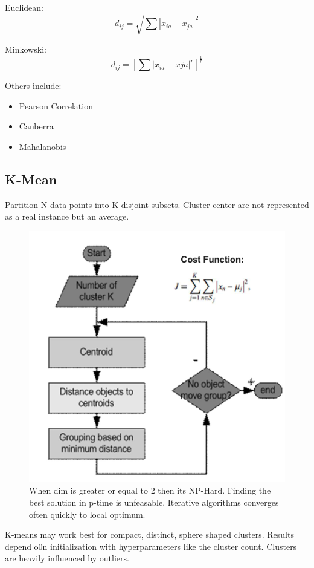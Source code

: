 \documentclass[../Main.tex]{subfiles}
\begin{document}
Euclidean:
\begin{equation}
    d_{ij} = \sqrt{\sum |x_{ia} - x_{ja}|^2 }
\end{equation}

Minkowski:
\begin{equation}
    d_{ij} = [\sum |x_{ia}- x{ja}|^r]^{\frac{1}{r}} 
\end{equation}

Others include:
\begin{itemize}
    \item Pearson Correlation
    \item Canberra
    \item Mahalanobis
\end{itemize}

\subsection{K-Mean}
Partition N data points into K disjoint subsets.
Cluster center are not represented as a real instance but an average.

\begin{figure}[H]
    \centering
    \includegraphics[width=0.75\linewidth]{Images/datan/k-means.png}
    \caption{When dim is greater or equal to 2 then its NP-Hard. 
    Finding the best solution in p-time is unfeasable.
    Iterative algorithms converges often quickly to local optimum.}
\end{figure}

K-means may work best for compact, distinct, sphere shaped clusters.
Results depend o0n initialization with hyperparameters like the cluster count.
Clusters are heavily influenced by outliers.
\end{document}
